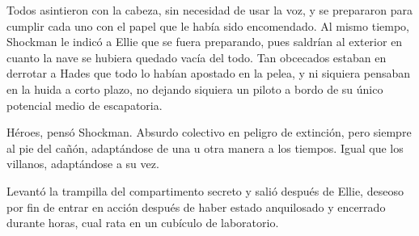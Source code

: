 Todos asintieron con la cabeza, sin necesidad de usar la voz, y se prepararon para cumplir cada uno con el papel que le había sido encomendado. Al mismo tiempo, Shockman le indicó a Ellie que se fuera preparando, pues saldrían al exterior en cuanto la nave se hubiera quedado vacía del todo. Tan obcecados estaban en derrotar a Hades que todo lo habían apostado en la pelea, y ni siquiera pensaban en la huida a corto plazo, no dejando siquiera un piloto a bordo de su único potencial medio de escapatoria.

Héroes, pensó Shockman. Absurdo colectivo en peligro de extinción, pero siempre al pie del cañón, adaptándose de una u otra manera a los tiempos. Igual que los villanos, adaptándose a su vez.

Levantó la trampilla del compartimento secreto y salió después de Ellie, deseoso por fin de entrar en acción después de haber estado anquilosado y encerrado durante horas, cual rata en un cubículo de laboratorio.

\endinput

